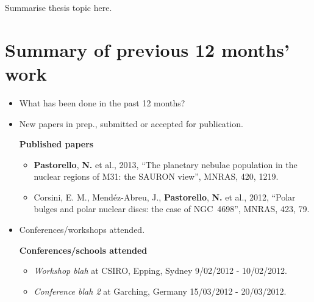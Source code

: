 \documentclass[useAMS,usenatbib,onecolumn]{mnras}
\begin{document}
Summarise thesis topic here.
 

\section{Summary of previous 12 months' work}
\label{sec:summary}

\begin{itemize}
  \item{What has been done in the past 12 months?}
  \item{New papers in prep., submitted or accepted for publication.\\}

  \textbf{Published papers}
  \begin{itemize}
      \item{\textbf{Pastorello}, \textbf{N.} et al., 2013}, ``The planetary nebulae population in the nuclear regions of M31: the SAURON view'', MNRAS, 420, 1219.
      \item{Corsini, E. M., Mend\'ez-Abreu, J., \textbf{Pastorello}, \textbf{N.} et al., 2012}, ``Polar bulges and polar nuclear discs: the case of NGC~4698'', MNRAS, 423, 79.
  \end{itemize}

  \item{Conferences/workshops attended.\\}

  \textbf{Conferences/schools attended}
  \begin{itemize}
      \item{\textit{Workshop blah}} at CSIRO, Epping, Sydney 9/02/2012 - 10/02/2012.
      \item{\textit{Conference blah 2}} at Garching, Germany 15/03/2012 - 20/03/2012.
  \end{itemize}

\end{itemize}

\end{document}

